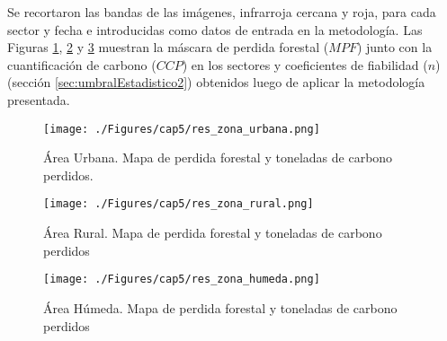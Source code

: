 Se recortaron las bandas de las im\'agenes, infrarroja cercana y roja, para cada sector y fecha e introducidas como datos de entrada en la metodolog\'ia. Las Figuras \ref{fig:ubana}, \ref{fig:rural} y \ref{fig:humeda} muestran la m\'ascara de perdida forestal ($ MPF $) junto con la cuantificaci\'on de carbono ($ CCP $) en los sectores y coeficientes de fiabilidad ($ n $) (secci\'on \ref{sec:umbralEstadistico2}) obtenidos luego de aplicar la metodolog\'ia presentada.
\begin{figure}[H]
	\centering
	\texttt{[image: ./Figures/cap5/res\_zona\_urbana.png]}
	\caption{\'Area Urbana. Mapa de perdida forestal y toneladas de carbono perdidos.}
	\label{fig:ubana}
\end{figure}
\begin{figure}[H]
	\centering
	\texttt{[image: ./Figures/cap5/res\_zona\_rural.png]}
	\caption{\'Area Rural. Mapa de perdida forestal y toneladas de carbono perdidos}
	\label{fig:rural}
\end{figure}
\begin{figure}[H]
	\centering
	\texttt{[image: ./Figures/cap5/res\_zona\_humeda.png]}
	\caption{\'Area H\'umeda. Mapa de perdida forestal y toneladas de carbono perdidos}
	\label{fig:humeda}
\end{figure}


